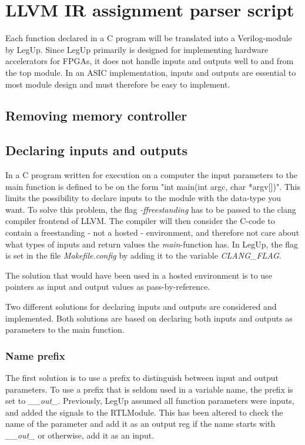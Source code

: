 \section{LLVM IR assignment parser script}
Each function declared in a C program will be translated into a Verilog-module by LegUp. Since LegUp primarily is designed for implementing hardware accelerators for FPGAs, it does not handle inputs and outputs well to and from the top module. In an ASIC implementation, inputs and outputs are essential to most module design and must therefore be easy to implement.

\subsection{Removing memory controller}

\subsection{Declaring inputs and outputs}
In a C program written for execution on a computer the input parameters to the main function is defined to be on the form "int main(int argc, char *argv[])". This limits the possibility to declare inputs to the module with the data-type you want. To solve this problem, the flag \textit{-ffreestanding} has to be passed to the clang compiler frontend of LLVM. The compiler will then consider the C-code to contain a freestanding - not a hosted - environment, and therefore not care about what types of inputs and return values the \textit{main}-function has. In LegUp, the flag is set in the file \textit{Makefile.config} by adding it to the variable \textit{CLANG\_FLAG}.

The solution that would have been used in a hosted environment is to use pointers as input and output values as pass-by-reference.

Two different solutions for declaring inputs and outputs are considered and implemented. Both solutions are based on declaring both inputs and outputs as parameters to the main function.
\subsubsection{Name prefix}
The first solution is to use a prefix to distinguish between input and output parameters. To use a prefix that is seldom used in a variable name, the prefix is set to \textit{\_\_out\_}. Previously, LegUp assumed all function parameters were inputs, and added the signals to the RTLModule. This has been altered to check the name of the parameter and add it as an output reg if the name starts with \textit{\_\_out\_} or otherwise, add it as an input.

